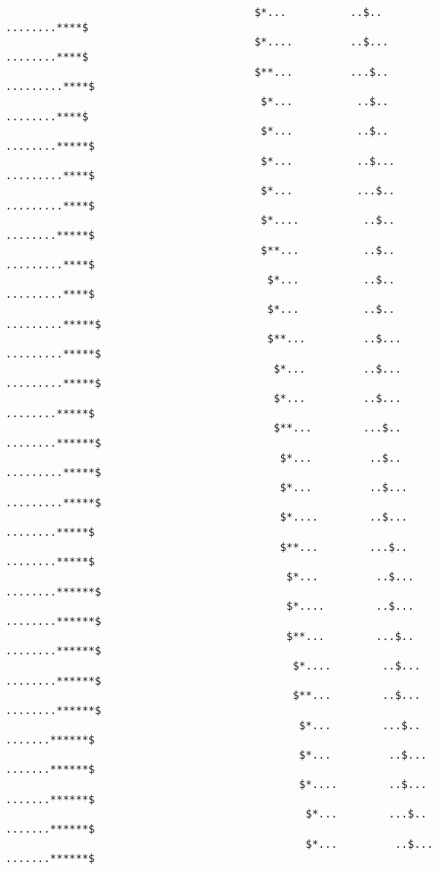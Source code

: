 \begin{verbatim}
                                       $*...          ..$..             ........****$
                                       $*....         ..$...            ........****$
                                       $**...         ...$..            .........****$
                                        $*...          ..$..             ........****$
                                        $*...          ..$..             ........*****$
                                        $*...          ..$...            .........****$
                                        $*...          ...$..            .........****$
                                        $*....          ..$..             ........*****$
                                        $**...          ..$..             .........****$
                                         $*...          ..$..             .........****$
                                         $*...          ..$..             .........*****$
                                         $**...         ..$...            .........*****$
                                          $*...         ..$...            .........*****$
                                          $*...         ..$...             ........*****$
                                          $**...        ...$..             ........******$
                                           $*...         ..$..             .........*****$
                                           $*...         ..$...            .........*****$
                                           $*....        ..$...             ........*****$
                                           $**...        ...$..             ........*****$
                                            $*...         ..$...            ........******$
                                            $*....        ..$...            ........******$
                                            $**...        ...$..            ........******$
                                             $*....        ..$...           ........******$
                                             $**...        ..$...           ........******$
                                              $*...        ...$..            .......******$
                                              $*...         ..$...           .......******$
                                              $*....        ..$...           .......******$
                                               $*...        ...$..           .......******$
                                               $*...         ..$...          .......******$

\end{verbatim}
